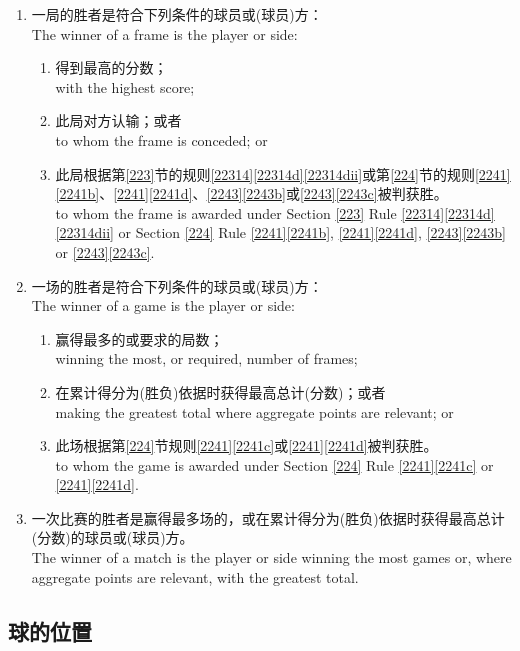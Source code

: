 \begin{enumerate}[label=(\alph*)]
    \item 一局的胜者是符合下列条件的球员或(球员)方：\\
    The winner of a frame is the player or side:
    \begin{enumerate}[label=(\roman*)]
        \item 得到最高的分数；\\
        with the highest score;
        \item 此局对方认输；或者\\
        to whom the frame is conceded; or
        \item 此局根据第\ref{223}节的规则\ref{22314}\ref{22314d}\ref{22314dii}或第\ref{224}节的规则\ref{2241}\ref{2241b}、\ref{2241}\ref{2241d}、\ref{2243}\ref{2243b}或\ref{2243}\ref{2243c}被判获胜。\\
        to whom the frame is awarded under Section \ref{223} Rule \ref{22314}\ref{22314d} \ref{22314dii} or Section \ref{224} Rule \ref{2241}\ref{2241b}, \ref{2241}\ref{2241d}, \ref{2243}\ref{2243b} or \ref{2243}\ref{2243c}.
    \end{enumerate}
    \item 一场的胜者是符合下列条件的球员或(球员)方：\\
    The winner of a game is the player or side:
    \begin{enumerate}[label=(\roman*)]
        \item 赢得最多的或要求的局数；\\
        winning the most, or required, number of frames;
        \item 在累计得分为(胜负)依据时获得最高总计(分数)；或者\\
        making the greatest total where aggregate points are relevant; or
        \item 此场根据第\ref{224}节规则\ref{2241}\ref{2241c}或\ref{2241}\ref{2241d}被判获胜。\\
        to whom the game is awarded under Section \ref{224} Rule \ref{2241}\ref{2241c} or \ref{2241}\ref{2241d}.
    \end{enumerate}
    \item \label{2231h}一次比赛的胜者是赢得最多场的，或在累计得分为(胜负)依据时获得最高总计(分数)的球员或(球员)方。\\
    The winner of a match is the player or side winning the most games or, where aggregate points are relevant, with the greatest total.
\end{enumerate}

\subsection{球的位置}\label{2232}

